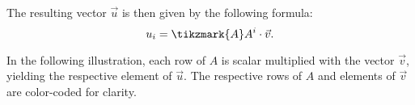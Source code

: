 The resulting vector $\vec{u}$ is then given by the following formula:
\[
	u_{i} = \tikzmark{A}A^{i}\cdot \vec{v}.
\]

\vspace{1em}
In the following illustration, each row of $A$ is scalar multiplied with the vector $\vec{v}$, yielding the respective element of $\vec{u}$. The respective rows of $A$ and elements of $\vec{v}$ are color-coded for clarity.


